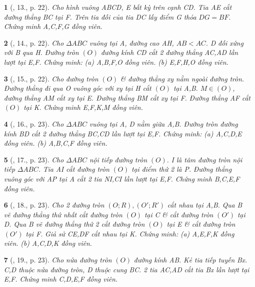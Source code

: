 \documentclass{article}
\newtheorem{baitoan}{}
\begin{document}
\begin{baitoan}[\cite{Thu_Chung_Viet_Minh_circ}, 13., p. 22]
	Cho hình vuông ABCD, E bất kỳ trên cạnh CD. Tia AE cắt đường thẳng BC tại F. Trên tia đối của tia DC lấy điểm G thỏa $DG = BF$. Chứng minh A,C,F,G đồng viên.
\end{baitoan}

\begin{baitoan}[\cite{Thu_Chung_Viet_Minh_circ}, 14., p. 22]
	Cho $\Delta ABC$ vuông tại A, đường cao AH, $AB < AC$. D đối xứng với B qua H. Đường tròn $(O)$ đường kính CD cắt 2 đường thẳng AC,AD lần lượt tại E,F. Chứng minh: (a) A,B,F,O đồng viên. (b) E,F,H,O đồng viên.
\end{baitoan}

\begin{baitoan}[\cite{Thu_Chung_Viet_Minh_circ}, 15., p. 22]
	Cho đường tròn $(O)$ \& đường thẳng xy nằm ngoài đường tròn. Đường thẳng đi qua O vuông góc với xy tại H cắt $(O)$ tại A,B. $M\in(O)$, đường thẳng AM cắt xy tại E. Đường thẳng BM cắt xy tại F. Đường thẳng AF cắt $(O)$ tại K. Chứng minh E,F,K,M đồng viên.
\end{baitoan}

\begin{baitoan}[\cite{Thu_Chung_Viet_Minh_circ}, 16., p. 23]
	Cho $\Delta ABC$ vuông tại A, D nằm giữa A,B. Đường tròn đường kính BD cắt 2 đường thẳng BC,CD lần lượt tại E,F. Chứng minh: (a) A,C,D,E đồng viên. (b) A,B,C,F đồng viên.
\end{baitoan}

\begin{baitoan}[\cite{Thu_Chung_Viet_Minh_circ}, 17., p. 23]
	Cho $\Delta ABC$ nội tiếp đường tròn $(O)$. I là tâm đường tròn nội tiếp $\Delta ABC$. Tia AI cắt đường tròn $(O)$ tại điểm thứ 2 là P. Đường thẳng vuông góc với AP tại A cắt 2 tia NI,CI lần lượt tại E,F. Chứng minh B,C,E,F đồng viên.
\end{baitoan}

\begin{baitoan}[\cite{Thu_Chung_Viet_Minh_circ}, 18., p. 23]
	Cho 2 đường tròn $(O;R),(O';R')$ cắt nhau tại A,B. Qua B vẽ đường thẳng thứ nhất cắt đường tròn $(O)$ tại C \& cắt đường tròn $(O')$ tại D. Qua B vẽ đường thẳng thứ 2 cắt đường tròn $(O)$ tại E \& cắt đường tròn $(O')$ tại F. Giả sử CE,DF cắt nhau tại K. Chứng minh: (a) A,E,F,K đồng viên. (b) A,C,D,K đồng viên.
\end{baitoan}

\begin{baitoan}[\cite{Thu_Chung_Viet_Minh_circ}, 19., p. 23]
	Cho nửa đường tròn $(O)$ đường kính AB. Kẻ tia tiếp tuyến Bx. C,D thuộc nửa đường tròn, D thuộc cung BC. 2 tia AC,AD cắt tia Bx lần lượt tại E,F. Chứng minh C,D,E,F đồng viên.
\end{baitoan}
\end{document}
